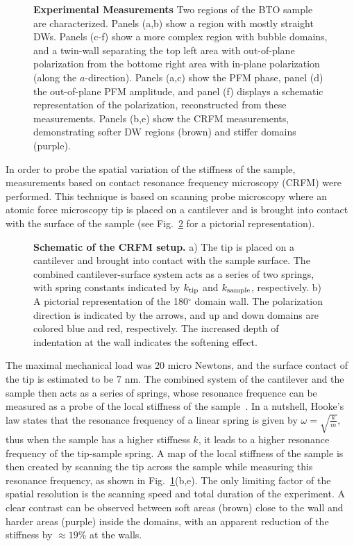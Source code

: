 \begin{figure}
	\caption{\label{fig:BTO_experiment} {\bf Experimental Measurements} Two regions of the BTO sample are characterized. Panels (a,b) show a region with mostly straight DWs. Panels (c-f) show a more complex region with bubble domains, and a twin-wall separating the top left area with out-of-plane polarization from the bottome right area with in-plane polarization (along the $a$-direction). Panels (a,c) show the PFM phase, panel (d) the out-of-plane PFM amplitude, and panel (f) displays a schematic representation of the polarization, reconstructed from these measurements. Panels (b,e) show the CRFM measurements, demonstrating softer DW regions (brown) and stiffer domains (purple).}
\end{figure}

In order to probe the spatial variation of the stiffness of the sample, measurements based on contact resonance frequency microscopy (CRFM) were performed.
This technique is based on scanning probe microscopy where an atomic force microscopy tip is placed on a cantilever and is brought into contact with the surface of the sample (see Fig.~\ref{fig:BTO_experimental_schematic} for a pictorial representation).
\begin{figure}
	\caption{\label{fig:BTO_experimental_schematic} {\bf Schematic of the CRFM setup.} a) The tip is placed on a cantilever and brought into contact with the sample surface. The combined cantilever-surface system acts as a series of two springs, with spring constants indicated by $k_{\rm tip}$ and $k_{\rm sample}$, respectively. b) A pictorial representation of the 180$^\circ$ domain wall. The polarization direction is indicated by the arrows, and up and down domains are colored blue and red, respectively. The increased depth of indentation at the wall indicates the softening effect.}
\end{figure}
The maximal mechanical load was 20 micro Newtons, and the surface contact of the tip is estimated to be 7 nm.
The combined system of the cantilever and the sample then acts as a series of springs, whose resonance frequence can be measured as a probe of the local stiffness of the sample~\cite{Rabe2000}.
In a nutshell, Hooke's law states that the resonance frequency of a linear spring is given by $\omega = \sqrt{\frac{k}{m}}$, thus when the sample has a higher stiffness $k$, it leads to a higher resonance frequency of the tip-sample spring.
A map of the local stiffness of the sample is then created by scanning the tip across the sample while measuring this resonance frequency, as shown in Fig.~\ref{fig:BTO_experiment}(b,e).
The only limiting factor of the spatial resolution is the scanning speed and total duration of the experiment.  
A clear contrast can be observed between soft areas (brown) close to the wall and harder areas (purple) inside the domains, with an apparent reduction of the stiffness by $\approx 19\%$ at the walls.

